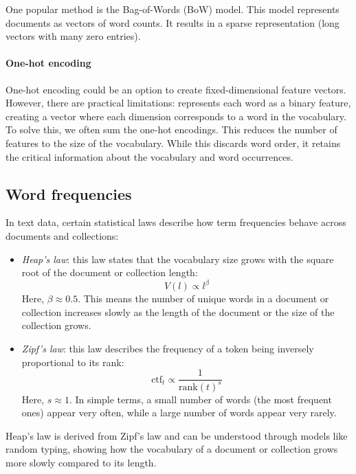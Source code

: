 One popular method is the Bag-of-Words (BoW) model.
This model represents documents as vectors of word counts.
It results in a sparse representation (long vectors with many zero entries).

\paragraph*{One-hot encoding}
One-hot encoding could be an option to create fixed-dimensional feature vectors. 
However, there are practical limitations: represents each word as a binary feature, creating a vector where each dimension corresponds to a word in the vocabulary.
To solve this, we often sum the one-hot encodings. 
This reduces the number of features to the size of the vocabulary.
While this discards word order, it retains the critical information about the vocabulary and word occurrences.

\subsection{Word frequencies}
In text data, certain statistical laws describe how term frequencies behave across documents and collections:
\begin{itemize}
    \item \textit{Heap's law}: this law states that the vocabulary size grows with the square root of the document or collection length:
        \[V(l)\propto l^{\beta}\]
        Here, $\beta \approx 0.5$. 
        This means the number of unique words in a document or collection increases slowly as the length of the document or the size of the collection grows.
    \item \textit{Zipf's law}: this law describes the frequency of a token being inversely proportional to its rank:
        \[\text{ctf}_t\propto\dfrac{1}{\text{rank}(t)^s}\]
        Here, $s\approx 1$. 
        In simple terms, a small number of words (the most frequent ones) appear very often, while a large number of words appear very rarely. 
\end{itemize}
\noindent Heap's law is derived from Zipf's law and can be understood through models like random typing, showing how the vocabulary of a document or collection grows more slowly compared to its length.

